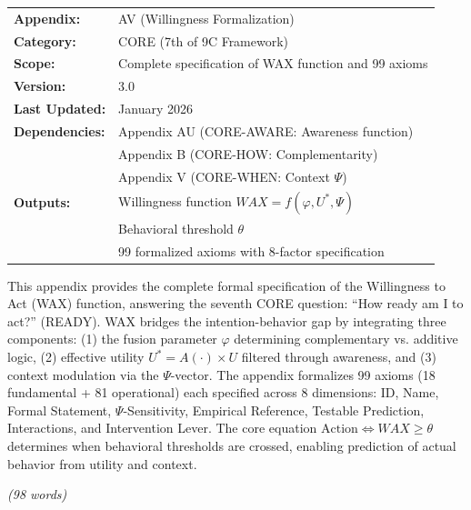\begin{tcolorbox}[colback=blue!5!white, colframe=blue!75!black,
    title=\textbf{Appendix AV: CORE-READY}]

\begin{tabular}{@{}ll@{}}
\textbf{Appendix:} & AV (Willingness Formalization) \\
\textbf{Category:} & CORE (7th of 9C Framework) \\
\textbf{Scope:} & Complete specification of WAX function and 99 axioms \\
\textbf{Version:} & 3.0 \\
\textbf{Last Updated:} & January 2026 \\
\textbf{Dependencies:} & Appendix AU (CORE-AWARE: Awareness function) \\
                       & Appendix B (CORE-HOW: Complementarity) \\
                       & Appendix V (CORE-WHEN: Context $\Psi$) \\
\textbf{Outputs:} & Willingness function $WAX = f(\varphi, U^*, \Psi)$ \\
                  & Behavioral threshold $\theta$ \\
                  & 99 formalized axioms with 8-factor specification \\
\end{tabular}

\end{tcolorbox}


\begin{tcolorbox}[colback=white, colframe=black,
    title=\textbf{Abstract}]

This appendix provides the complete formal specification of the Willingness to Act (WAX) function,
answering the seventh CORE question: ``How ready am I to act?'' (READY). WAX bridges the
intention-behavior gap by integrating three components: (1) the fusion parameter $\varphi$ determining
complementary vs. additive logic, (2) effective utility $U^* = A(\cdot) \times U$ filtered through
awareness, and (3) context modulation via the $\Psi$-vector. The appendix formalizes 99 axioms
(18 fundamental + 81 operational) each specified across 8 dimensions: ID, Name, Formal Statement,
$\Psi$-Sensitivity, Empirical Reference, Testable Prediction, Interactions, and Intervention Lever.
The core equation $\text{Action} \Leftrightarrow WAX \geq \theta$ determines when behavioral
thresholds are crossed, enabling prediction of actual behavior from utility and context.

\textit{(98 words)}

\end{tcolorbox}

